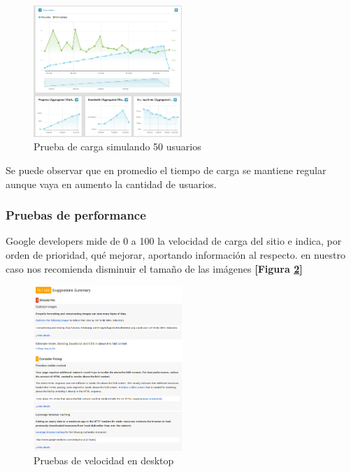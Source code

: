   \begin{figure}[h]
  	\centering
  	\includegraphics[width=0.5\textwidth]{img/prueba_carga_50_us}
  	\caption{Prueba de carga simulando 50 usuarios}
  	\label{prueba_carga_50_us}
  \end{figure}
  
  Se puede observar que en promedio el tiempo de carga se mantiene regular aunque vaya en aumento la cantidad de usuarios.
  
  \subsubsection{Pruebas de performance}
  Google developers mide de 0 a 100 la velocidad de carga del sitio e indica, por orden de prioridad, qué mejorar, aportando información al respecto.
  en nuestro caso nos recomienda disminuir el tamaño de las imágenes \textbf{[Figura \ref{prueba_velocidad_1}]}
  
  \newpage
  
  \begin{figure}[h]
  	\centering
  	\includegraphics[width=0.5\textwidth]{img/prueba_velocidad_1}
  	\caption{Pruebas de velocidad en desktop}
  	\label{prueba_velocidad_1}
  \end{figure}
  
